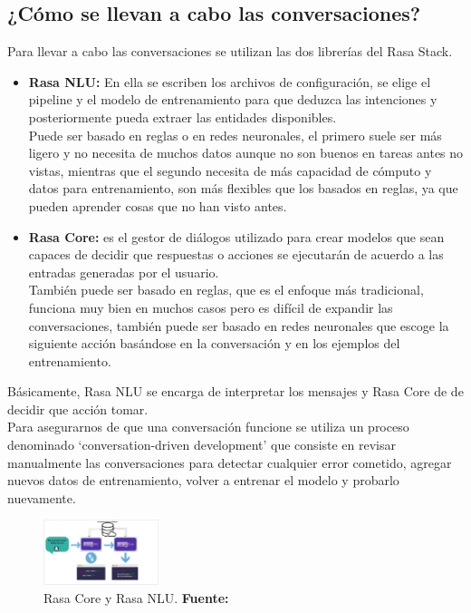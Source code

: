 \subsection{¿Cómo se llevan a cabo las conversaciones?}
Para llevar a cabo las conversaciones se utilizan las dos librerías del Rasa Stack.
\begin{itemize}
    \item \textbf{Rasa NLU: } En ella  se escriben los archivos de configuración, se elige el pipeline y el modelo de entrenamiento para que deduzca las intenciones y posteriormente pueda extraer las entidades disponibles.\\
    \indent Puede ser basado en reglas o en redes neuronales, el primero suele ser más ligero y no necesita de muchos datos aunque no son buenos en tareas antes no vistas, mientras que el segundo necesita de más capacidad de cómputo y datos para entrenamiento, son más flexibles que los basados en reglas, ya que pueden aprender cosas que no han visto antes.
    \item \textbf{Rasa Core: } es el gestor de diálogos utilizado para crear modelos que sean capaces de decidir que respuestas o acciones se ejecutarán de acuerdo a las entradas generadas por el usuario.\\
    También puede ser basado en reglas, que es el enfoque más tradicional, funciona muy bien en muchos casos pero es difícil de expandir las conversaciones, también puede ser basado en redes neuronales que escoge la siguiente acción basándose en la conversación y en los ejemplos del entrenamiento.
\end{itemize}
\indent Básicamente, Rasa NLU se encarga de interpretar los mensajes y Rasa Core de de decidir que acción tomar.\\
\indent Para asegurarnos de que una conversación funcione se utiliza un proceso denominado ‘conversation-driven development’ que consiste en revisar manualmente las conversaciones para detectar cualquier error cometido, agregar nuevos datos de entrenamiento, volver a entrenar el modelo y probarlo nuevamente. \cite{Introduction_to_Rasa}
\begin{figure}[H]
\begin{centering}
\includegraphics[angle=0,width=0.3\textwidth]{Figuras/NLU-CORE.png}
\par \end{centering}
\caption[Rasa Core y Rasa NLU]{Rasa Core y Rasa NLU. \textbf{Fuente:} \cite{Rasa_Core-NLU}}
\label{Core-NLU}
\end{figure}


